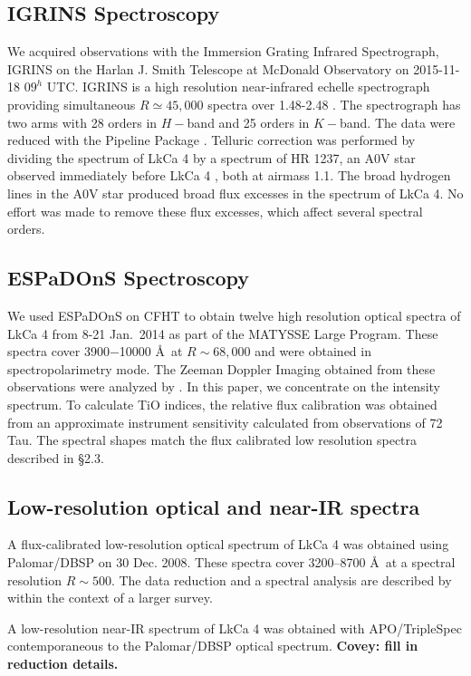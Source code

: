 \documentclass[twocolumn]{emulateapj}%
\newcommand{\name}{LkCa 4 }
\begin{document}
\subsection{IGRINS Spectroscopy}\label{sec:igrins} 
We acquired observations with the Immersion Grating Infrared Spectrograph, IGRINS \citep{park14} on the Harlan J. Smith Telescope at McDonald Observatory on 2015-11-18 $09^h$ UTC.  IGRINS is a high resolution near-infrared echelle spectrograph providing simultaneous $R\simeq45,000$ spectra over 1.48-2.48 \um.  The spectrograph has two arms with 28 orders in $H-$band and 25 orders in $K-$band.  The data were reduced with the Pipeline Package \citep{jaejoonlee15}.  Telluric correction was performed by dividing the spectrum of \name by a spectrum of HR 1237, an A0V star observed immediately before \name, both at airmass 1.1.  The broad hydrogen lines in the A0V star produced broad flux excesses in the spectrum of LkCa 4.  No effort was made to remove these flux excesses, which affect several spectral orders. 


\subsection{ESPaDOnS Spectroscopy}
We used ESPaDOnS on CFHT to obtain twelve high resolution optical spectra of \name from 8-21 Jan.~2014 as part of the MATYSSE Large Program.  These spectra cover 3900$-$10000 \AA\ at $R\sim68,000$ and were obtained in spectropolarimetry mode.  The Zeeman Doppler Imaging obtained from these observations were analyzed by \citet{donati14}.  In this paper, we concentrate on the intensity spectrum.  To calculate TiO indices, the relative flux calibration was obtained from an approximate instrument sensitivity calculated from observations of 72 Tau.  The spectral shapes match the flux calibrated low resolution spectra described in \S 2.3.


\subsection{Low-resolution optical and near-IR spectra}

A flux-calibrated low-resolution optical spectrum of LkCa 4 was obtained using Palomar/DBSP \citep{Oke1982} on 30 Dec. 2008.  These spectra cover 3200--8700 \AA\ at a spectral resolution $R\sim 500$.  The data reduction and a spectral analysis are described by \citet{herczeg14} within the context of a larger survey.

A low-resolution near-IR spectrum of LkCa 4 was obtained with APO/TripleSpec \citep{Wilson04} contemporaneous to the Palomar/DBSP optical spectrum.  {\bf Covey:  fill in reduction details.}
\end{document}
